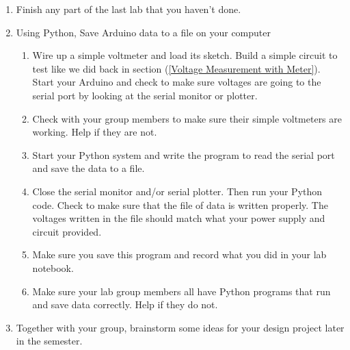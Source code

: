 \activity
{
\begin{enumerate}
\item Finish any part of the last lab that you haven't done.

\item Using Python, Save Arduino data to a file on your computer

	\begin{enumerate}
	\item Wire up a simple voltmeter and load its sketch. Build a simple circuit
	to test like we did back in section (\ref{Voltage Measurement with Meter}).
	Start your Arduino and check to make sure voltages are going to the serial
	port by looking at the serial monitor or plotter.
	
	\item Check with your group members to make sure their simple voltmeters are
	working. Help if they are not.
	
	\item Start your Python system 
        and write the program to read the serial port and
	save the data to a file.
	
	\item Close the serial monitor and/or serial plotter. Then run your Python
	code. Check to make sure that the file of data is written properly. The
	voltages written in the file should match what your power supply and circuit
	provided.
	
	\item Make sure you save this program and record what you did in your lab
	notebook.
	
	\item Make sure your lab group members all have Python programs that run and
	save data correctly. Help if they do not.
	\end{enumerate}

\item Together with your group, brainstorm some ideas for your
    design project later in the
semester.

\end{enumerate}
}
